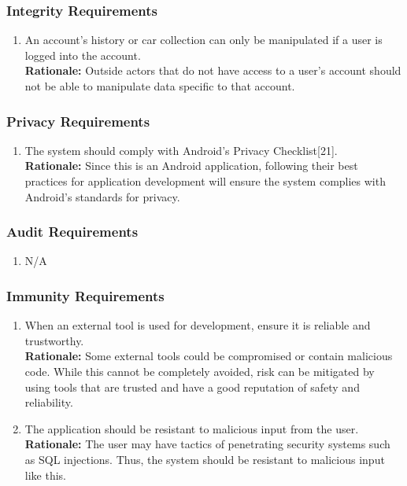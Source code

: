 \documentclass[]{article}
\begin{document}
\subsubsection{Integrity Requirements}
\label{ssub:integrity_requirements}
\begin{enumerate}[label={SR-INT\arabic*.}]
    \item An account's history or car collection can only be manipulated if a user is logged into the account.\\
    \textbf{Rationale:} Outside actors that do not have access to a user's account should not be able to manipulate data specific to that account.
\end{enumerate}

\subsubsection{Privacy Requirements}
\label{ssub:privacy_requirements}
\begin{enumerate}[label={SR-P\arabic*.}]
    \item The system should comply with Android's Privacy Checklist[21].\\
    \textbf{Rationale:} Since this is an Android application, following their best practices for application development will ensure the system complies with Android's standards for privacy.
\end{enumerate}

\subsubsection{Audit Requirements}
\label{ssub:audit_requirements}
\begin{enumerate}[label={SR-AU\arabic*.}]
    \item N/A
\end{enumerate}

\subsubsection{Immunity Requirements}
\label{ssub:immunity_requirements}
\begin{enumerate}[label={SR-IM\arabic*.}]
    \item When an external tool is used for development, ensure it is reliable and trustworthy.\\
    \textbf{Rationale:} Some external tools could be compromised or contain malicious code. While this cannot be completely avoided, risk can be mitigated by using tools that are trusted and have a good reputation of safety and reliability.
    \item The application should be resistant to malicious input from the user.\\
    \textbf{Rationale:} The user may have tactics of penetrating security systems such as SQL injections. Thus, the system should be resistant to malicious input like this.
\end{enumerate}
\end{document}
